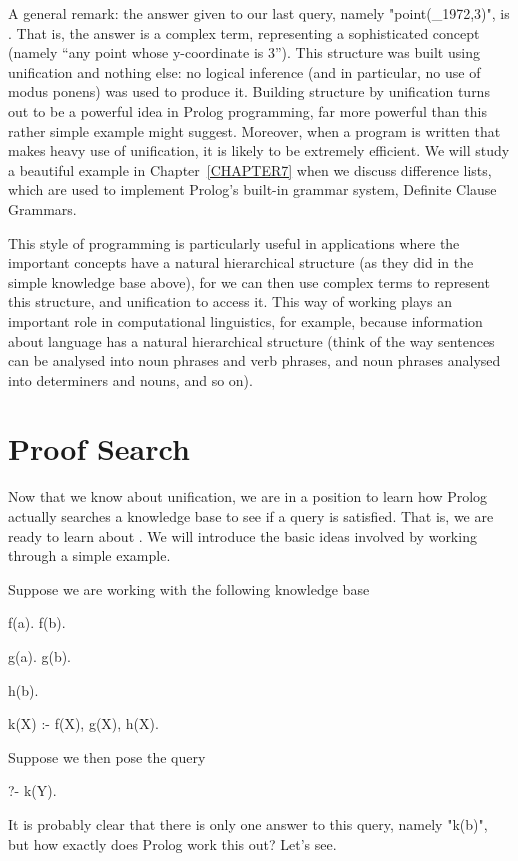 A general remark: the answer given to our last query, namely
"point(\_1972,3)", is . That is, the answer is a
complex term, representing a sophisticated concept (namely ``any point
whose y-coordinate is 3''). This structure was built using unification
and nothing else: no logical inference (and in particular, no use of
modus ponens) was used to produce it.  Building structure by
unification turns out to be a powerful idea in Prolog programming, far
more powerful than this rather simple example might suggest.
Moreover, when a program is written that makes heavy use of
unification, it is likely to be extremely efficient. We will study a
beautiful example in Chapter~\ref{CHAPTER7} when we discuss difference
lists, which are used to implement Prolog's built-in grammar system,
Definite Clause Grammars.

This style of programming is particularly useful in applications where
the important concepts have a natural hierarchical structure (as they
did in the simple knowledge base above), for we can then use complex
terms to represent this structure, and unification to access it.  This
way of working plays an important role in computational linguistics,
for example, because information about language has a natural
hierarchical structure (think of the way sentences can be analysed
into noun phrases and verb phrases, and noun phrases analysed into
determiners and nouns, and so on).



\section{Proof Search}\label{SEC.L2.PROOFSEARCH}

Now that we know about unification, we are in a position to learn how
Prolog actually searches a knowledge base to see if a query is
satisfied. That is, we are  ready to learn about .  We will introduce the basic ideas involved by working
through a simple example.

Suppose we are working with the following knowledge base
\begin{LPNcodedisplay}
f(a).
f(b).

g(a).
g(b).

h(b).

k(X) :- f(X), g(X), h(X).
\end{LPNcodedisplay}
%
Suppose we  then pose the query
\begin{LPNcodedisplay}
?- k(Y).
\end{LPNcodedisplay}
%
It is probably clear that there is only one answer to this query,
namely "k(b)", but how exactly does Prolog work this out? Let's see.

